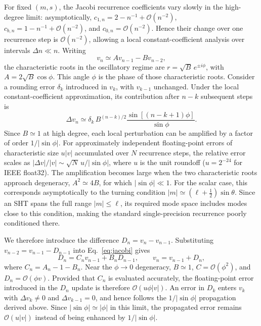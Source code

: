 \documentclass[letters,usenatbib,useAMS]{mnras}
\begin{document}
For fixed $(m,s)$, the Jacobi recurrence coefficients vary slowly in the high-degree limit: asymptotically,
$c_{1,n}=2-n^{-1}+\mathcal{O}(n^{-2})$,
$c_{b,n}=1-n^{-1}+\mathcal{O}(n^{-2})$, and
$c_{0,n}=\mathcal{O}(n^{-2})$.
Hence their change over one recurrence step is $\mathcal{O}(n^{-2})$, allowing a local constant-coefficient analysis over intervals $\Delta n\ll n$. Writing
\begin{equation}
v_n\simeq A v_{n-1}-Bv_{n-2},
\end{equation}
the characteristic roots in the oscillatory regime are
$r=\sqrt{B}\,e^{\pm i\phi}$, with
$A=2\sqrt{B}\cos\phi$. This angle $\phi$ is the phase of those characteristic roots. Consider a rounding error $\delta_k$ introduced in $v_k$, with $v_{k-1}$ unchanged. Under the local constant-coefficient approximation, its contribution after $n-k$ subsequent steps is
\begin{equation}
\Delta v_n
\simeq
\delta_k\,B^{(n-k)/2}
\frac{\sin[(n-k+1)\phi]}{\sin\phi}.
\end{equation}
Since $B\simeq1$ at high degree, each local perturbation can be amplified
by a factor of order $1/|\sin\phi|$. For approximately independent
floating-point errors of characteristic size $u|v|$ accumulated over $N$
recurrence steps, the relative error scales as
$\lvert\Delta v\rvert/|v|\sim\sqrt{N}\,u/|\sin\phi|$, where $u$ is the
unit roundoff ($u=2^{-24}$ for IEEE float32). The amplification becomes
large when the two characteristic roots approach degeneracy,
$A^2\simeq4B$, for which $|\sin\phi|\ll1$. For the scalar case, this
corresponds asymptotically to the turning condition
$|m|\simeq(\ell+\tfrac12)\sin\theta$. Since an SHT spans the full range
$|m|\leq\ell$, its required mode space includes modes close to this
condition, making the standard single-precision recurrence poorly
conditioned there. 

We therefore introduce the difference
$D_n=v_n-v_{n-1}$. Substituting
$v_{n-2}=v_{n-1}-D_{n-1}$ into Eq.~\eqref{eq:jacobi} gives
\begin{equation}
\label{eq:diff}
D_n=C_n v_{n-1}+B_nD_{n-1},
\qquad
v_n=v_{n-1}+D_n,
\end{equation}
where $C_n=A_n-1-B_n$. Near the $\phi\rightarrow0$ degeneracy,
$B\simeq1$, $C=\mathcal{O}(\phi^2)$, and
$D_n=\mathcal{O}(\phi v)$. Provided that $C_n$ is evaluated accurately,
the floating-point error introduced in the $D_n$ update is therefore
$\mathcal{O}(u\phi|v|)$. An error in $D_k$ enters $v_k$ with
$\Delta v_k\neq0$ and $\Delta v_{k-1}=0$, and hence follows the
$1/|\sin\phi|$ propagation derived above. Since
$|\sin\phi|\simeq|\phi|$ in this limit, the propagated error remains
$\mathcal{O}(u|v|)$ instead of being enhanced by
$1/|\sin\phi|$.
\end{document}
